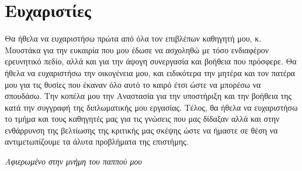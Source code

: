\section*{Ευχαριστίες}

Θα ήθελα να ευχαριστήσω πρώτα από όλα τον επιβλέπων καθηγητή μου, κ. Μουστάκα για την ευκαιρία που μου έδωσε να ασχοληθώ με τόσο ενδιαφέρον ερευνητικό πεδίο, αλλά και για την άψογη συνεργασία και βοήθεια που πρόσφερε. Θα ήθελα να ευχαριστήσω την οικογένεια μου, και ειδικότερα την μητέρα και τον πατέρα μου για τις θυσίες που έκαναν όλο αυτό το καιρό έτσι ώστε να μπορέσω να σπουδάσω. Την κοπέλα μου την Αναστασία για την υποστήριξη και την βοήθεια της κατά την συγγραφή της διπλωματικής μου εργασίας. Τέλος, θα ήθελα να ευχαριστήσω το τμήμα και τους καθηγητές μας για τις γνώσεις που μας δίδαξαν αλλά και στην ενθάρρυνση της βελτίωσης της κριτικής μας σκέψης ώστε να ήμαστε σε θέση να αντιμετωπίζουμε τα άλυτα προβλήματα της επιστήμης.

\thispagestyle{empty}
\clearpage

\begin{center}
  \null\vfill
  \large{{\em Αφιερωμένο στην μνήμη του παππού μου}}
  \vspace{2cm}
  \null\vfill
\end{center}

\thispagestyle{empty} 